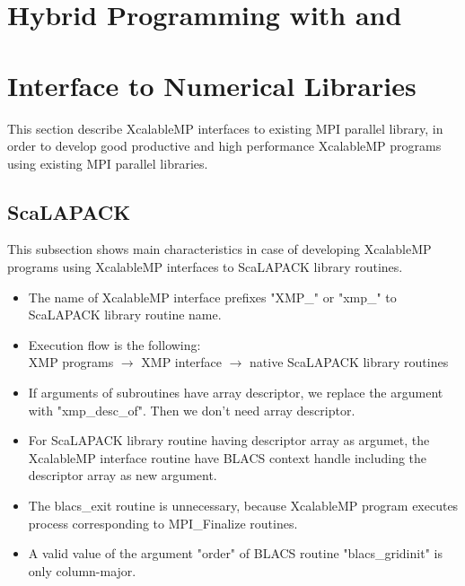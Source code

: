 \chapter{Hybrid Programming with {\MPI} and {\OMP}}

\section{{\MPI}}

\section{{\OMP}}

\chapter{Interface to Numerical Libraries}

   This section describe XcalableMP interfaces to existing MPI parallel library, 
   in order to develop good productive and high performance XcalableMP programs 
   using existing MPI parallel libraries.
   
\section{ScaLAPACK}

   This subsection shows main characteristics in case of developing
   XcalableMP programs using XcalableMP interfaces to ScaLAPACK library routines.

\begin{itemize}
\item The name of XcalableMP interface prefixes "XMP\_" or "xmp\_" 
      to ScaLAPACK library routine name.
\item Execution flow is the following:\\
      XMP programs $\to$ XMP interface $\to$ native ScaLAPACK library routines
\item If arguments of subroutines have array descriptor,
      we replace the argument with "xmp\_desc\_of".
      Then we don't need array descriptor. 
\item For ScaLAPACK library routine having descriptor array as argumet,
      the XcalableMP interface routine have BLACS context handle including 
      the descriptor array as new argument.
\item The blacs\_exit routine is unnecessary, because XcalableMP program executes process 
      corresponding to MPI\_Finalize routines.
\item A valid value of the argument "order" of BLACS routine "blacs\_gridinit" is 
      only column-major. 
\end{itemize}

